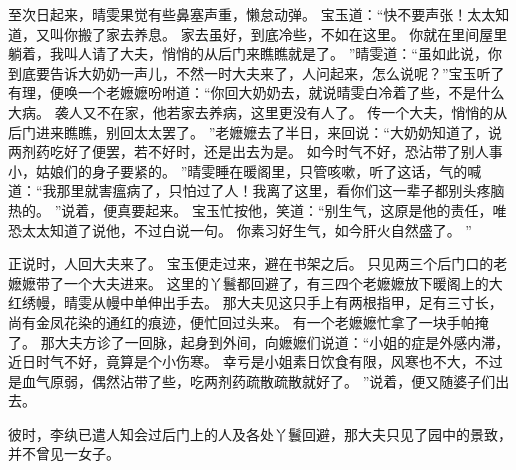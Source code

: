 至次日起来，晴雯果觉有些鼻塞声重，懒怠动弹。
宝玉道：“快不要声张！太太知道，又叫你搬了家去养息。
家去虽好，到底冷些，不如在这里。
你就在里间屋里躺着，我叫人请了大夫，悄悄的从后门来瞧瞧就是了。
”晴雯道：“虽如此说，你到底要告诉大奶奶一声儿，不然一时大夫来了，人问起来，怎么说呢？”宝玉听了有理，便唤一个老嬷嬷吩咐道：“你回大奶奶去，就说晴雯白冷着了些，不是什么大病。
袭人又不在家，他若家去养病，这里更没有人了。
传一个大夫，悄悄的从后门进来瞧瞧，别回太太罢了。
”老嬷嬷去了半日，来回说：“大奶奶知道了，说两剂药吃好了便罢，若不好时，还是出去为是。
如今时气不好，恐沾带了别人事小，姑娘们的身子要紧的。
”晴雯睡在暖阁里，只管咳嗽，听了这话，气的喊道：“我那里就害瘟病了，只怕过了人！我离了这里，看你们这一辈子都别头疼脑热的。
”说着，便真要起来。
宝玉忙按他，笑道：“别生气，这原是他的责任，唯恐太太知道了说他，不过白说一句。
你素习好生气，如今肝火自然盛了。
”\par
正说时，人回大夫来了。
宝玉便走过来，避在书架之后。
只见两三个后门口的老嬷嬷带了一个大夫进来。
这里的丫鬟都回避了，有三四个老嬷嬷放下暖阁上的大红绣幔，晴雯从幔中单伸出手去。
那大夫见这只手上有两根指甲，足有三寸长，
尚有金凤花染的通红的痕迹，便忙回过头来。
有一个老嬷嬷忙拿了一块手帕掩了。
那大夫方诊了一回脉，起身到外间，向嬷嬷们说道：“小姐的症是外感内滞，近日时气不好，竟算是个小伤寒。
幸亏是小姐素日饮食有限，风寒也不大，不过是血气原弱，偶然沾带了些，吃两剂药疏散疏散就好了。
”说着，便又随婆子们出去。
\par
彼时，李纨已遣人知会过后门上的人及各处丫鬟回避，那大夫只见了园中的景致，并不曾见一女子。
